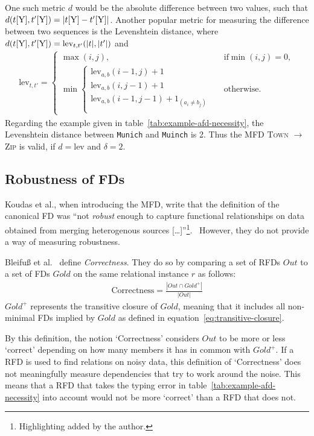 One such metric \( d \) would be the absolute difference between two values, such that \( d(t[\textsc{Y}], t'[\textsc{Y}]) = | t[\textsc{Y}] - t'[\textsc{Y}]| \).
Another popular metric for measuring the difference between two sequences is the Levenshtein distance, where \( d(t[\textsc{Y}], t'[\textsc{Y}]) = \text{lev}_{t,t'}(|t|, |t'|) \) and
\begin{align*}
    \text{lev}_{t,t'} =
    \begin{cases}
        \max(i,j),  & \text{if} \min(i,j)=0, \\
        \min \begin{cases}
            \text{lev}_{a, b}(i-1, j)+1 & \\
            \text{lev}_{a, b}(i, j-1)+1 & \\
            \text{lev}_{a, b}(i-1, j-1)+1_{(a_i \neq b_j)} \\
        \end{cases} & \text{otherwise.}
    \end{cases}
\end{align*}
Regarding the example given in table~\ref{tab:example-afd-necessity}, the Levenshtein distance between \texttt{Munich} and \texttt{Muinch} is 2.
Thus the MFD \textsc{Town} \( \to\) \textsc{Zip} is valid, if \( d = \text{lev} \) and \( \delta = 2 \).

\subsection{Robustness of FDs}
Koudas et al., when introducing the MFD, write that the definition of the canonical FD was ``not \emph{robust} enough to capture functional relationships on data obtained from merging heterogenous sources [\dots]''\footnote{Highlighting added by the author.}.~\cite[p.~1]{KOU09}
However, they do not provide a way of measuring robustness.

Bleifuß et al.~\cite[p.~3]{BLE16} define \emph{Correctness}.
They do so by comparing a set of RFDs \( Out \) to a set of FDs \( Gold \) on the same relational instance \( r \) as follows:
\begin{align*}
    \text{Correctness} = \frac{|Out \cap Gold^{+}|}{|Out|}
\end{align*}
\( Gold^{+} \) represents the transitive closure of \( Gold \), meaning that it includes all non-minimal FDs implied by \( Gold \) as defined in equation~\ref{eq:transitive-closure}.

By this definition, the notion `Correctness' considers \( Out \) to be more or less `correct' depending on how many members it has in common with \( Gold^{+} \).
If a RFD is used to find relations on noisy data, this definition of `Correctness' does not meaningfully measure dependencies that try to work around the noise.
This means that a RFD that takes the typing error in table~\ref{tab:example-afd-necessity} into account would not be more `correct' than a RFD that does not.

